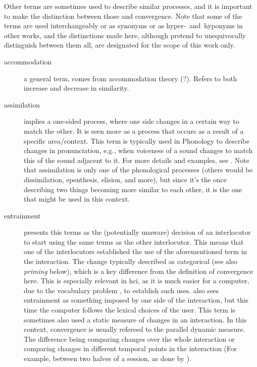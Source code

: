 Other terms are sometimes used to describe similar processes, and it is important to make the distinction between those and convergence.
Note that some of the terms are used interchangeably or as synonyms or as hyper-~and~hyponyms in other works, and the distinctions made here, although pretend to unequivocally distinguish between them all, are designated for the scope of this work only.
\begin{description}
	\item[accommodation] a general term, comes from accommodation theory (?).
	Refers to both increase and decrease in similarity.
	
	\item[assimilation] implies a one-sided process, where one side changes in a certain way to match the other.
	It is seen more as a process that occurs as a result of a specific area/context.
	This term is typically used in Phonology to describe changes in pronunciation, e.g., when voiceness of a sound changes to match this of the sound adjacent to it.
	For more details and examples, see \cite[][chapter 3.3, pp. 89-98]{Hall2011phonologie}.
	Note that assimilation is only one of the phonological processes (others would be dissimilation, epenthesis, elision, and more), but since it's the once describing two things becoming more similar to each other, it is the one that might be used in this context.
	
	\item[entrainment] \citet{Brennan1996lexical} presents this terms as the (potentially unaware) decision of an interlocutor to start using the same terms as the other interlocutor. This means that one of the interlocutors established the use of the aforementioned term in the interaction.
	The change typically described as categorical (see also \textit{priming} below), which is a key difference from the definition of convergence here.
	This is especially relevant in \ac{hci}, as it is much easier for a computer, due to the vocabulary problem \citep{Furnas1987vocabulary}, to establish such uses.
	\citet{Lopes2013automated} also sees entrainment as something imposed by one side of the interaction, but this time the computer follows the lexical choices of the user.
	This term is sometimes also used a static measure of changes in an interaction. In this context, convergence is usually refereed to the parallel dynamic measure. The difference being comparing changes over the whole interaction or comparing changes in different temporal points in the interaction (For example, between two halves of a session, as done by \citet{Xia2014prosodic}).
	

\end{description}
